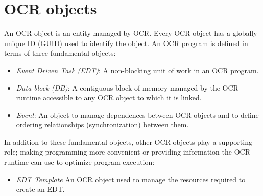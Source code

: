 %

\section{OCR objects}
\label{sec:OCRobjects}

An OCR object is an entity managed by OCR. Every OCR
object has a globally unique ID (GUID) used to identify the
object. An OCR program is defined in terms of three fundamental objects:
\begin{itemize}
\item \emph{Event Driven Task (EDT)}: A non-blocking unit of work in an OCR
program.
\item\emph{Data block (DB)}: A contiguous block of memory managed by the
OCR runtime accessible to any OCR object to which it is linked.
\item\emph{Event}: An object to manage dependences between OCR objects and
to define ordering relationships (synchronization) between them.
\end{itemize}

In addition to these fundamental objects, other OCR objects
play a supporting role; making programming more convenient or
providing information the OCR runtime can use to optimize program execution:
\begin{itemize}
\item \emph{EDT Template} An OCR object used to manage the resources
required to create an EDT.
\end{itemize}

